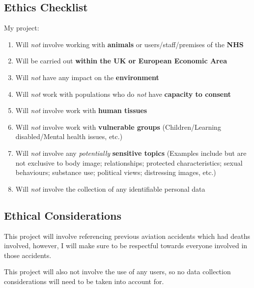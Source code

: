 \documentclass[a4paper]{article}
\begin{document}
\subsection{Ethics Checklist}
My project:
\begin{enumerate}
    \item Will \textit{not} involve working with \textbf{animals} or
        users/staff/premises of the \textbf{NHS}
    \item Will be carried out \textbf{within the UK or European
        Economic Area}
    \item Will \textit{not} have any impact on the \textbf{environment}
    \item Will \textit{not} work with populations who do \textit{not}
        have \textbf{capacity to consent}
    \item Will \textit{not} involve work with \textbf{human tissues}
    \item Will \textit{not} involve work with \textbf{vulnerable groups}
        (Children/Learning disabled/Mental health issues, etc.)
    \item Will \textit{not} involve any \textit{potentially}
        \textbf{sensitive topics} (Examples include but are not
        exclusive to body image; relationships; protected
        characteristics; sexual behaviours; substance use;
        political views; distressing images, etc.)
    \item Will \textit{not} involve the collection of any identifiable
        personal data
\end{enumerate}

\subsection{Ethical Considerations}
This project will involve referencing previous aviation
accidents which had deaths involved, however, I will make
sure to be respectful towards everyone involved in
those accidents.

This project will also not involve the use of any users,
so no data collection considerations will need to be taken
into account for.
\clearpage


\nocite{*}
\printbibliography[heading=bibnumbered]
\end{document}
